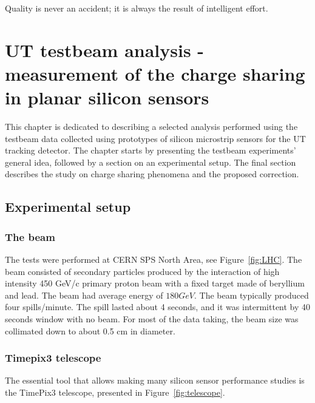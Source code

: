 \begin{savequote}[75mm] 
Quality is never an accident; it is always the result of intelligent effort. 
\end{savequote}


\chapter{UT testbeam analysis - measurement of the charge sharing
in planar silicon sensors}
\label{chapter:testbeam}

This chapter is dedicated to describing a selected analysis performed using the testbeam data collected using prototypes of silicon microstrip sensors for the UT tracking detector.  The chapter starts by presenting the testbeam experiments' general idea, followed by a section on an experimental setup. The final section describes the study on charge sharing phenomena and the proposed correction. 

\section{Experimental setup}

\subsection{The beam}
The tests were performed at CERN SPS North Area, see Figure~\ref{fig:LHC}. The beam consisted of secondary particles produced by the interaction of high intensity 450 GeV/c primary proton beam with a fixed target made of beryllium and lead. The beam had average energy of $180 GeV$.  
The beam typically produced four spills/minute. The spill lasted about 4 seconds, and it was intermittent by 40 seconds window with no beam. For most of the data taking, the beam size was collimated down to about 0.5 cm in diameter.

\subsection{Timepix3 telescope}
The essential tool that allows making many silicon sensor performance studies is the TimePix3 telescope, presented in Figure~\ref{fig:telescope}. 


